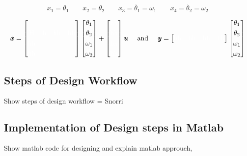 \begin{equation}
x_1 = \theta_1 \qquad x_2 = \theta_2\qquad x_3 = \dot{\theta_1}=\omega_1\qquad x_4 = \dot{\theta_2} = \omega_2
\label{eq:3}
\end{equation}

\begin{equation}
\dot{\text{\textit{\textbf{x}}}} = \begin{bmatrix}
& & & \\[0.3em]
\text{\color{white}H\color{black}} &\text{\color{white}h\color{black}} &\text{\color{white}hh\color{black}} &\text{\color{white}hh\color{black}} \\[0.3em]
\text{\color{white}hh\color{black}}& & & \\[0.3em]
\text{\color{white}hh\color{black}} & & &
\end{bmatrix}
\begin{bmatrix}
\theta_1\\[0.3em]
\theta_2\\[0.3em]
\omega_1\\[0.3em]
\omega_2\\
\end{bmatrix}
+
\begin{bmatrix}
\text{\color{white}hh\color{black}}\\[0.3em]
\text{\color{white}hh\color{black}}\\[0.3em]
\text{\color{white}hh\color{black}}\\[0.3em]
\text{\color{white}hh\color{black}}\\
\end{bmatrix}\text{\textit{\textbf{u}}}
\quad \text{ and } \quad
\text{\textit{\textbf{y}}}=\begin{bmatrix}
\text{\color{white}hh\color{black}} &\text{\color{white}hh\color{black}}&\text{\color{white}hh\color{black}}&\text{\color{white}hh\color{black}}
\end{bmatrix}
\begin{bmatrix}
\theta_1\\[0.3em]
\theta_2\\[0.3em]
\omega_1\\[0.3em]
\omega_2\\
\end{bmatrix}
\label{eq:4}
\end{equation}

\subsection{Steps of Design Workflow}


 \color{red}
 Show steps of design workflow = Snorri
 \color{black}
 
\subsection{Implementation of Design steps in Matlab}
\color{red}
 Show matlab code for designing and explain matlab approuch,
\color{black}
